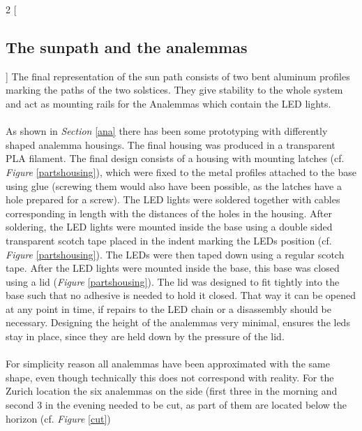 \documentclass[a4paper,9pt]{article}
\begin{document}
    \begin{multicols}{2}
    [
        \subsection{The sunpath and the analemmas}
        \label{sunpa}
    ]
    The final representation of the sun path consists of two bent aluminum profiles marking the paths of the two solstices. They give stability to the whole system and act as mounting rails for the Analemmas which contain the LED lights. \\
    \\
    As shown in \textit{Section} \ref{ana} there has been some prototyping with differently shaped analemma housings. The final housing was produced in a transparent PLA filament. The final design consists of a housing with mounting latches (cf. \textit{Figure} \ref{partshousing}), which were fixed to the metal profiles attached to the base using glue (screwing them would also have been possible, as the latches have a hole prepared for a screw). The LED lights were soldered together with cables corresponding in length with the distances of the holes in the housing. After soldering, the LED lights were mounted inside the base using a double sided transparent scotch tape placed in the indent marking the LEDs position (cf. \textit{Figure} \ref{partshousing}). The LEDs were then taped down using a regular scotch tape. After the LED lights were mounted inside the base, this base was closed using a lid (\textit{Figure} \ref{partshousing}). The lid was designed to fit tightly into the base such that no adhesive is needed to hold it closed. That way it can be opened at any point in time, if repairs to the LED chain or a disassembly should be necessary. Designing the height of the analemmas very minimal, ensures the leds stay in place, since they are held down by the pressure of the lid. \\
    \\
    For simplicity reason all analemmas have been approximated with the same shape, even though technically this does not correspond with reality. For the Zurich location the six analemmas on the side (first three in the morning and second 3 in the evening needed to be cut, as part of them are located below the horizon (cf. \textit{Figure} \ref{cut})
    \end{multicols}
       
\end{document}

